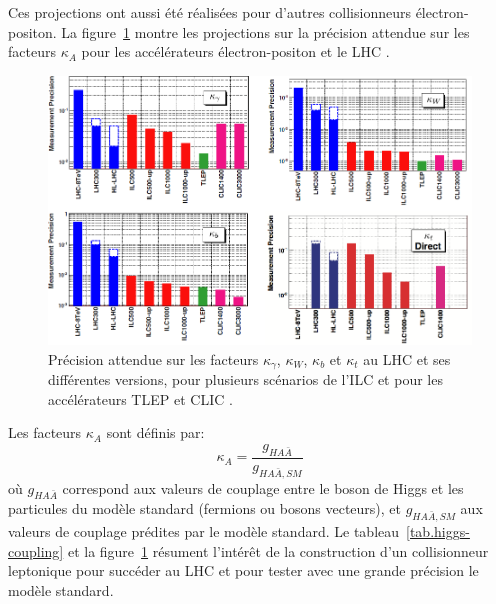 Ces projections ont aussi été réalisées pour d'autres collisionneurs électron-positon. La figure~\ref{fig:kappa_factor} montre les projections sur la précision attendue sur les facteurs $\kappa_A$ pour les accélérateurs électron-positon et le LHC \cite{snowmass}. 
\begin{figure}[!h]
   \begin{center}
     \includegraphics[width=1.0\textwidth]{ILC/figs/kappa_factor.png}
     \caption{Précision attendue sur les facteurs $\kappa_{\gamma}$, $\kappa_{W}$, $\kappa_{b}$ et $\kappa_{t}$ au LHC et ses différentes versions, pour plusieurs scénarios de l'ILC et pour les accélérateurs TLEP et CLIC \cite{snowmass}.}
     \label{fig:kappa_factor}
   \end{center}
\end{figure}
Les facteurs $\kappa_A$ sont définis par:
\begin{equation}
  \kappa_A=\frac{g_{HA\bar{A}}}{g_{HA\bar{A},SM}}
\end{equation}
où $g_{HA\bar{A}}$ correspond aux valeurs de couplage entre le boson de Higgs et les particules du modèle standard (fermions ou bosons vecteurs), et $g_{HA\bar{A},SM}$ aux valeurs de couplage prédites par le modèle standard. Le tableau~\ref{tab.higgs-coupling} et la figure~\ref{fig:kappa_factor} résument l'intérêt de la construction d'un collisionneur leptonique pour succéder au LHC et pour tester avec une grande précision le modèle standard.

